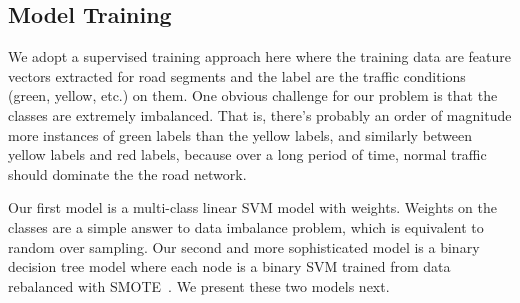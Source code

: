 \subsection{Model Training}
\label{sec:model}
We adopt a supervised training approach here where the training data are feature
vectors extracted for road segments and the label are the traffic conditions
(green, yellow, etc.) on them. One obvious challenge for our problem is that
the classes are extremely imbalanced. That is, there's probably an 
order of magnitude more instances of green labels than the yellow labels, and 
similarly between yellow labels and red labels, because over a long period of time,
normal traffic should dominate the the road network.

Our first model is a multi-class linear SVM model with weights. Weights
on the classes are a simple answer to data imbalance problem, 
which is equivalent to random over sampling. 
Our second and more sophisticated model is a binary decision tree
model where each node is a binary SVM trained from data rebalanced with 
SMOTE~\cite{chawla2002smote}. We present these two models next.


